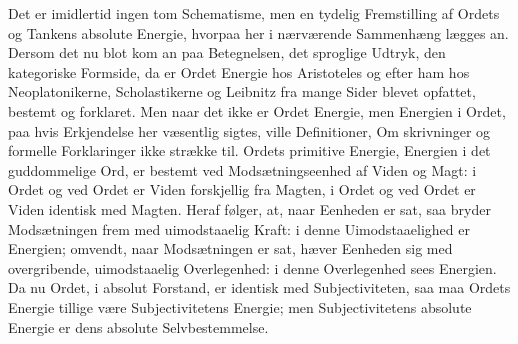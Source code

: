 \documentclass[12pt]{book}
\newcommand{\opage}[1]{\marginnote{\footnotesize\textit{[#1]}}}
\begin{document}
Det er imidlertid ingen tom Schematisme, men en tydelig Fremstilling af Ordets og Tankens absolute Energie, hvorpaa her i nærværende Sammenhæng lægges an. Dersom det nu blot kom an paa Betegnelsen, det sproglige Udtryk, den kategoriske Formside, da er Ordet Energie hos Aristoteles og efter ham hos Neoplatonikerne, Scholastikerne og Leibnitz fra mange Sider blevet opfattet, bestemt og forklaret. Men naar det ikke er Ordet Energie, men Energien i Ordet, paa hvis Erkjendelse her væsentlig sigtes, ville Definitioner, Om%
\opage{342}skrivninger og formelle Forklaringer ikke strække til. Ordets primitive Energie, Energien i det guddommelige Ord, er bestemt ved Modsætningseenhed af Viden og Magt: i Ordet og ved Ordet er Viden forskjellig fra Magten, i Ordet og ved Ordet er Viden identisk med Magten. Heraf følger, at, naar Eenheden er sat, saa bryder Modsætningen frem med uimodstaaelig Kraft: i denne Uimodstaaelighed er Energien; omvendt, naar Modsætningen er sat, hæver Eenheden sig med overgribende, uimodstaaelig Overlegenhed: i denne Overlegenhed sees Energien. Da nu Ordet, i absolut Forstand, er identisk med Subjectiviteten, saa maa Ordets Energie tillige være Subjectivitetens Energie; men Subjectivitetens absolute Energie er dens absolute Selvbestemmelse.
\end{document}
